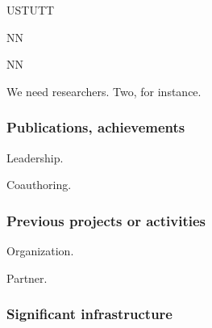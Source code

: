 \begin{sitedescription}{USTUTT}
\begin{participant}[type=res,PM=48,salary=5500]{NN}
\end{participant}
\begin{participant}[type=res,PM=36,salary=5500]{NN}

We need researchers. Two, for instance.

\end{participant}

\subsubsection*{Publications, achievements}

\begin{compactenum}
\item Leadership.
\item Coauthoring.
\end{compactenum}

\subsubsection*{Previous projects or activities}

\begin{compactenum}
\item Organization.
\item Partner.
\end{compactenum}

\subsubsection*{Significant infrastructure}

\end{sitedescription}

